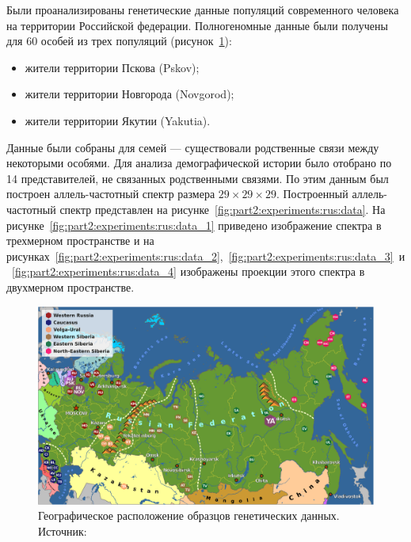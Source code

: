 Были проанализированы генетические данные популяций современного человека на территории Российской федерации.
Полногеномные данные были получены для 60 особей из трех популяций (рисунок~\ref{fig:part2:experiments:rus:geogr}):
\begin{itemize}
    \item жители территории Пскова (Pskov);
    \item жители территории Новгорода (Novgorod);
    \item жители территории Якутии (Yakutia).
\end{itemize}
Данные были собраны для семей --- существовали родственные связи между некоторыми особями.
Для анализа демографической истории было отобрано по 14 представителей, не связанных родственными связями.
По этим данным был построен аллель-частотный спектр размера $29 \times 29 \times 29$.
Построенный аллель-частотный спектр представлен на рисунке~\ref{fig:part2:experiments:rus:data}.
На рисунке~\ref{fig:part2:experiments:rus:data_1} приведено изображение спектра в трехмерном пространстве и на рисунках~\ref{fig:part2:experiments:rus:data_2},~\ref{fig:part2:experiments:rus:data_3}~и~\ref{fig:part2:experiments:rus:data_4} изображены проекции этого спектра в двухмерном пространстве.

\begin{figure}[ht]
    \centering
        \includegraphics[width=\linewidth]{images_experiments/rus_genomes/from_paper.pdf}
    \caption{Географическое расположение образцов генетических данных. Источник: \cite{zhernakova2020genome}}
    \label{fig:part2:experiments:rus:geogr}
\end{figure}

